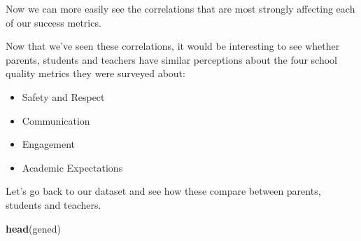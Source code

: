 \documentclass[]{article}
\newenvironment{Shaded}{\begin{snugshade}}{\end{snugshade}}
\newcommand{\KeywordTok}[1]{\textcolor[rgb]{0.13,0.29,0.53}{\textbf{#1}}}
\newcommand{\NormalTok}[1]{#1}
\providecommand{\tightlist}{%
  \setlength{\itemsep}{0pt}\setlength{\parskip}{0pt}}
\begin{document}
Now we can more easily see the correlations that are most strongly
affecting each of our success metrics.

Now that we've seen these correlations, it would be interesting to see
whether parents, students and teachers have similar perceptions about
the four school quality metrics they were surveyed about:

\begin{itemize}
\tightlist
\item
  Safety and Respect
\item
  Communication
\item
  Engagement
\item
  Academic Expectations
\end{itemize}

Let's go back to our dataset and see how these compare between parents,
students and teachers.

\begin{Shaded}
\begin{Highlighting}[]
\KeywordTok{head}\NormalTok{(gened)}
\end{Highlighting}
\end{Shaded}
\end{document}
